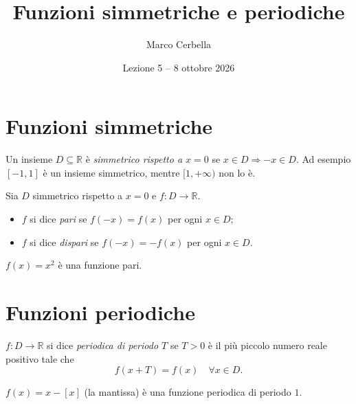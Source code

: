 \documentclass[11pt,a4paper]{article}
\title{Funzioni simmetriche e periodiche}
\author{Marco Cerbella}
\date{Lezione 5 -- 8 ottobre 2026}
\begin{document}
\maketitle

\section{Funzioni simmetriche}

Un insieme $D \subseteq \mathbb{R}$ è \emph{simmetrico rispetto a $x = 0$} se $x \in D \Rightarrow -x \in D$. Ad esempio $[-1, 1]$ è un insieme simmetrico, mentre $[1, +\infty)$ non lo è.

\begin{definizione}
Sia $D$ simmetrico rispetto a $x = 0$ e $f : D \to \mathbb{R}$.
\begin{itemize}
    \item $f$ si dice \emph{pari} se $f(-x) = f(x)$ per ogni $x \in D$;
    \item $f$ si dice \emph{dispari} se $f(-x) = -f(x)$ per ogni $x \in D$.
\end{itemize}
\end{definizione}

\begin{esempio}
$f(x) = x^2$ è una funzione pari.
\end{esempio}

\section{Funzioni periodiche}

\begin{definizione}
$f : D \to \mathbb{R}$ si dice \emph{periodica di periodo $T$} se $T > 0$ è il più piccolo numero reale positivo tale che
\[
f(x + T) = f(x) \quad \forall x \in D.
\]
\end{definizione}

\begin{esempio}
$f(x) = x - [x]$ (la mantissa) è una funzione periodica di periodo $1$.
\end{esempio}
\end{document}
